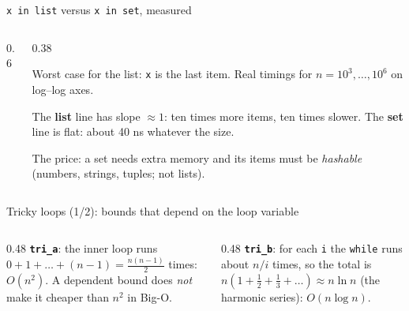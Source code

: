 \documentclass[aspectratio=169,10pt]{beamer}
\begin{document}
\begin{frame}{\texttt{x in list} versus \texttt{x in set}, measured}
\begin{columns}[T]
\begin{column}{0.6\textwidth}
\begin{sfig}[0.7]
\end{sfig}
\end{column}
\begin{column}{0.38\textwidth}
{\small
Worst case for the list: \texttt{x} is the last item. Real timings for $n=10^3,\dots,10^6$ on log--log axes.

\vspace{2mm}
The \textbf{list} line has slope $\approx1$: ten times more items, ten times slower. The \textbf{set} line is flat: about 40 ns whatever the size.

\vspace{2mm}
The price: a set needs extra memory and its items must be \emph{hashable} (numbers, strings, tuples; not lists).}
\end{column}
\end{columns}
\end{frame}

\begin{frame}{Tricky loops (1/2): bounds that depend on the loop variable}
\begin{columns}[T]
\begin{column}{0.48\textwidth}
\vspace{1mm}
{\small
\textbf{\texttt{tri\_a}}: the inner loop runs $0+1+\dots+(n-1)=\frac{n(n-1)}{2}$ times: $O(n^2)$. A dependent bound does \emph{not} make it cheaper than $n^2$ in Big-O.}
\end{column}
\begin{column}{0.48\textwidth}
\vspace{1mm}
{\small
\textbf{\texttt{tri\_b}}: for each \texttt{i} the \texttt{while} runs about $n/i$ times, so the total is $n(1+\frac12+\frac13+\dots)\approx n\ln n$ (the harmonic series): $O(n\log n)$.}
\end{column}
\end{columns}
\end{frame}
\end{document}
